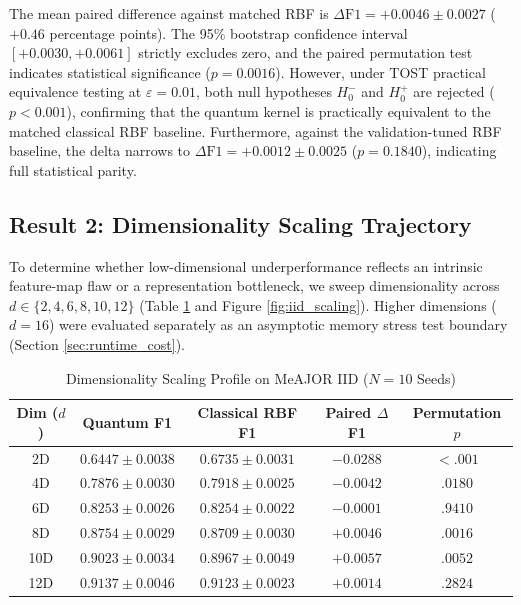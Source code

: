 \documentclass[10pt,twocolumn,letterpaper]{article}
\begin{document}
The mean paired difference against matched RBF is $\Delta\text{F1} = +0.0046 \pm 0.0027$ ($+0.46$ percentage points). The 95\% bootstrap confidence interval $[+0.0030, +0.0061]$ strictly excludes zero, and the paired permutation test indicates statistical significance ($p = 0.0016$). However, under TOST practical equivalence testing at $\varepsilon = 0.01$, both null hypotheses $H_0^-$ and $H_0^+$ are rejected ($p < 0.001$), confirming that the quantum kernel is practically equivalent to the matched classical RBF baseline. Furthermore, against the validation-tuned RBF baseline, the delta narrows to $\Delta\text{F1} = +0.0012 \pm 0.0025$ ($p = 0.1840$), indicating full statistical parity.

\subsection{Result 2: Dimensionality Scaling Trajectory}
To determine whether low-dimensional underperformance reflects an intrinsic feature-map flaw or a representation bottleneck, we sweep dimensionality across $d \in \{2, 4, 6, 8, 10, 12\}$ (Table \ref{tab:dimensionality_scaling} and Figure \ref{fig:iid_scaling}). Higher dimensions ($d=16$) were evaluated separately as an asymptotic memory stress test boundary (Section \ref{sec:runtime_cost}).

\begin{table}[t]
\centering
\scriptsize
\caption{Dimensionality Scaling Profile on MeAJOR IID ($N=10$ Seeds)}
\label{tab:dimensionality_scaling}
\setlength{\tabcolsep}{2pt}
\begin{tabular}{ccccc}
\toprule
Dim ($d$) & Quantum F1 & Classical RBF F1 & Paired $\Delta$F1 & Permutation $p$ \\
\midrule
2D & $0.6447 \pm 0.0038$ & $0.6735 \pm 0.0031$ & $-0.0288$ & $<.001$ \\
4D & $0.7876 \pm 0.0030$ & $0.7918 \pm 0.0025$ & $-0.0042$ & $.0180$ \\
6D & $0.8253 \pm 0.0026$ & $0.8254 \pm 0.0022$ & $-0.0001$ & $.9410$ \\
8D & $0.8754 \pm 0.0029$ & $0.8709 \pm 0.0030$ & $+0.0046$ & $.0016$ \\
10D & $0.9023 \pm 0.0034$ & $0.8967 \pm 0.0049$ & $+0.0057$ & $.0052$ \\
12D & $0.9137 \pm 0.0046$ & $0.9123 \pm 0.0023$ & $+0.0014$ & $.2824$ \\
\bottomrule
\end{tabular}
\end{table}
\end{document}
